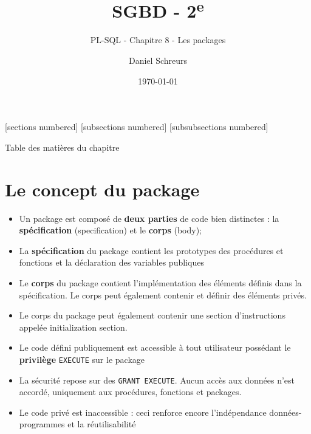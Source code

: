 \documentclass[10pt]{beamer}
\title{SGBD - 2\textsuperscript{e}}
\subtitle{PL-SQL - Chapitre 8 - Les packages}
\date{\today}
\author{Daniel Schreurs}
\institute{Haute École de Province de Liège}
\begin{document}
\maketitle

[sections numbered]
[subsections numbered]
[subsubsections numbered]
\begin{frame}[allowframebreaks]{Table des matières du chapitre}
    \tableofcontents[subsectionstyle=show/show/hide,subsubsectionstyle=show/show/hide,]
\end{frame}

\section{Le concept du package}

\begin{frame}{\secname}
    \begin{itemize}
        \item Un package est composé de \textbf{deux parties} de code bien distinctes : la \textbf{spécification} (specification) et le \textbf{corps} (body);
        \item La \textbf{spécification} du package contient les prototypes des procédures et fonctions et la déclaration des variables publiques
        \item Le \textbf{corps} du package contient l'implémentation des éléments définis dans la spécification.  Le corps peut également contenir et définir des éléments privés.
        \item Le corps du package peut également contenir une section d'instructions appelée initialization section.
    \end{itemize}
\end{frame}

\begin{frame}{\secname}
    \begin{itemize}
        \item Le code défini publiquement est accessible à tout utilisateur possédant le \textbf{privilège} \lstinline[language=plsql]!EXECUTE! sur le package
        \item La sécurité repose sur des \lstinline[language=plsql]!GRANT EXECUTE!. Aucun accès aux données n'est accordé, uniquement aux procédures, fonctions et packages.
        \item Le code privé est inaccessible : ceci renforce encore l'indépendance données-programmes et la réutilisabilité
    \end{itemize}
\end{frame}
\end{document}
